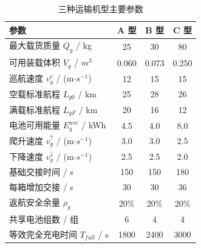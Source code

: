 \begin{table}[htbp]
\caption{三种运输机型主要参数}
\label{tab:uav_params}
\centering
{}
\setlength{\tabcolsep}{4pt}
\begin{tabular}{lccc}
\toprule
参数 & A 型 & B 型 & C 型 \\
\midrule
最大载货质量 $Q_{g}$ / kg & 25 & 30 & 80 \\
可用装载体积 $V_{g}$ / $m^{3}$ & 0.060 & 0.073 & 0.250 \\
巡航速度 $v_{g}^{c}$ / (m$\cdot$$s^{-1}$) & 12 & 15 & 15 \\
空载标准航程 $L_{g0}$ / km & 25 & 28 & 26 \\
满载标准航程 $L_{gF}$ / km & 20 & 16 & 12 \\
电池可用能量 $E_{g}^{use}$ / kWh & 4.5 & 4.0 & 8.0 \\
爬升速度 $v_{g}^{\uparrow}$ / (m$\cdot$$s^{-1}$) & 3.0 & 3.0 & 2.5 \\
下降速度 $v_{g}^{\downarrow}$ / (m$\cdot$$s^{-1}$) & 2.5 & 2.5 & 2.0 \\
基础交接时间 / s & 150 & 150 & 180 \\
每箱增加交接 / s & 30 & 30 & 36 \\
返航安全余量 $\rho_{g}$ & 20\% & 20\% & 20\% \\
共享电池组数 / 组 & 6 & 4 & 4 \\
等效完全充电时间 $T_{full}$ / s & 1800 & 2400 & 3000 \\
\bottomrule
\end{tabular}
\end{table}
